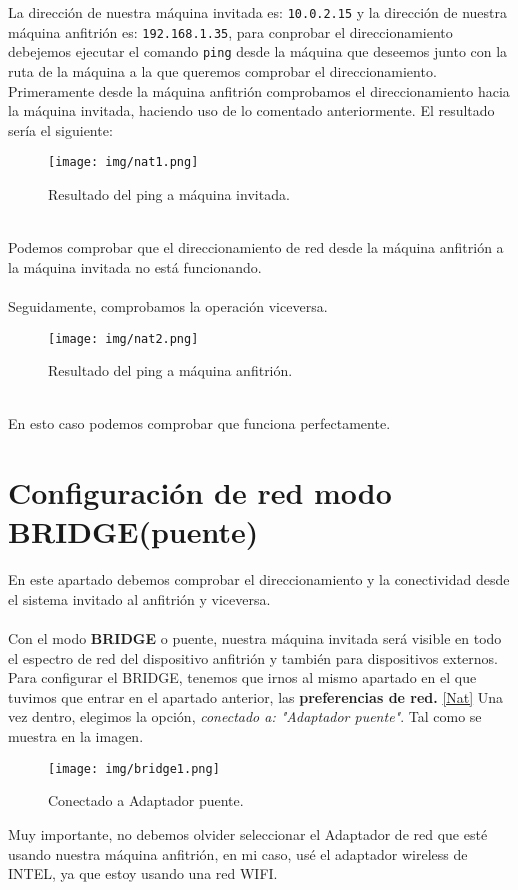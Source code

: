 \documentclass[12pt]{article}
\begin{document}
      La dirección de nuestra máquina invitada es: \texttt{10.0.2.15} y la dirección de nuestra máquina anfitrión es: \texttt{192.168.1.35}, 
      para conprobar el direccionamiento debejemos ejecutar el comando \texttt{ping} desde la máquina que deseemos junto con la ruta de la 
      máquina a la que queremos comprobar el direccionamiento.
      \\
      Primeramente desde la máquina anfitrión comprobamos el direccionamiento hacia la máquina invitada, haciendo uso de lo comentado anteriormente.
      El resultado sería el siguiente:
      \\
      \begin{figure}[h]
        \centering
        \texttt{[image: img/nat1.png]}
        \caption{Resultado del ping a máquina invitada.}
        \label{Nat3}
      \end{figure}
      \\
      Podemos comprobar que el direccionamiento de red desde la máquina anfitrión a la máquina invitada no está funcionando.
      \\\\
      Seguidamente, comprobamos la operación viceversa.
      \begin{figure}[h]
        \centering
        \texttt{[image: img/nat2.png]}
        \caption{Resultado del ping a máquina anfitrión.}
        \label{Nat4}
      \end{figure}
      \\
      En esto caso podemos comprobar que funciona perfectamente.

      \newpage

    \section{Configuración de red modo BRIDGE(puente)}
      En este apartado debemos comprobar el direccionamiento y la conectividad desde el sistema invitado al anfitrión y viceversa.
      \\\\
      Con el modo \textbf{BRIDGE} o puente, nuestra máquina invitada será visible en todo el espectro de red del dispositivo anfitrión 
      y también para dispositivos externos.
      \\
      Para configurar el BRIDGE, tenemos que irnos al mismo apartado en el que tuvimos que entrar en el apartado anterior, las \textbf{
      preferencias de red.} \ref{Nat} Una vez dentro, elegimos la opción, \textit{conectado a: "Adaptador puente"}. Tal como se muestra 
      en la imagen.
      \begin{figure}[h]
        \centering
        \texttt{[image: img/bridge1.png]}
        \caption{Conectado a Adaptador puente.}
        \label{Bridge1}
      \end{figure}
      Muy importante, no debemos olvider seleccionar el Adaptador de red que esté usando nuestra máquina anfitrión, en mi caso, usé el 
      adaptador wireless de INTEL, ya que estoy usando una red WIFI.
\end{document}

